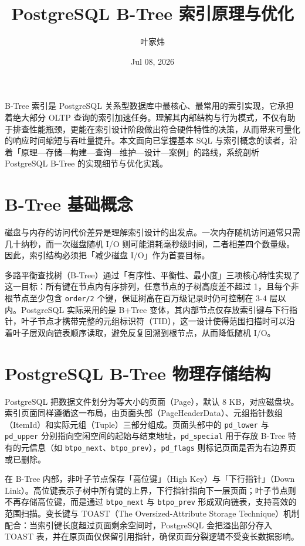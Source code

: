 \title{PostgreSQL B-Tree 索引原理与优化}
\author{叶家炜}
\date{Jul 08, 2026}
\maketitle
B-Tree 索引是 PostgreSQL 关系型数据库中最核心、最常用的索引实现，它承担着绝大部分 OLTP 查询的索引加速任务。理解其内部结构与行为模式，不仅有助于排查性能瓶颈，更能在索引设计阶段做出符合硬件特性的决策，从而带来可量化的响应时间缩短与吞吐量提升。本文面向已掌握基本 SQL 与索引概念的读者，沿着「原理—存储—构建—查询—维护—设计—案例」的路线，系统剖析 PostgreSQL B-Tree 的实现细节与优化实践。\par
\chapter{B-Tree 基础概念}
磁盘与内存的访问代价差异是理解索引设计的出发点。一次内存随机访问通常只需几十纳秒，而一次磁盘随机 I/O 则可能消耗毫秒级时间，二者相差四个数量级。因此，索引结构必须把「减少磁盘 I/O」作为首要目标。\par
多路平衡查找树（B-Tree）通过「有序性、平衡性、最小度」三项核心特性实现了这一目标：所有键在节点内有序排列，任意节点的子树高度差不超过 1，且每个非根节点至少包含 \texttt{order/2} 个键，保证树高在百万级记录时仍可控制在 3-4 层以内。PostgreSQL 实际采用的是 B+Tree 变体，其内部节点仅存放索引键与下行指针，叶子节点才携带完整的元组标识符（TID），这一设计使得范围扫描时可以沿着叶子层双向链表顺序读取，避免反复回溯到根节点，从而降低随机 I/O。\par
\chapter{PostgreSQL B-Tree 物理存储结构}
PostgreSQL 把数据文件划分为等大小的页面（Page），默认 8 KB，对应磁盘块。索引页面同样遵循这一布局，由页面头部（PageHeaderData）、元组指针数组（ItemId）和实际元组（Tuple）三部分组成。页面头部中的 \texttt{pd\_{}lower} 与 \texttt{pd\_{}upper} 分别指向空闲空间的起始与结束地址，\texttt{pd\_{}special} 用于存放 B-Tree 特有的元信息（如 \texttt{btpo\_{}next}、\texttt{btpo\_{}prev}），\texttt{pd\_{}flags} 则标记页面是否为右边界页或已删除。\par
在 B-Tree 内部，非叶子节点保存「高位键」（High Key）与「下行指针」（Down Link）。高位键表示子树中所有键的上界，下行指针指向下一层页面；叶子节点则不再存储高位键，而是通过 \texttt{btpo\_{}next} 与 \texttt{btpo\_{}prev} 形成双向链表，支持高效的范围扫描。变长键与 TOAST（The Oversized-Attribute Storage Technique）机制配合：当索引键长度超过页面剩余空间时，PostgreSQL 会把溢出部分存入 TOAST 表，并在原页面仅保留引用指针，确保页面分裂逻辑不受变长数据影响。\par
